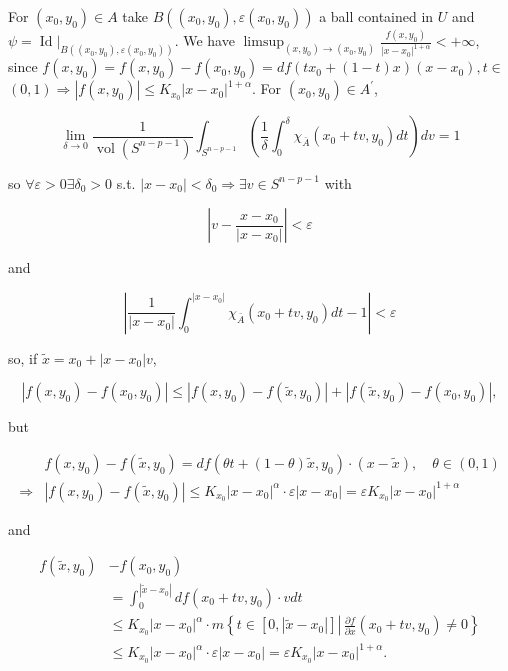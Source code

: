 \documentclass[10pt]{article}
\begin{document}
For $\left(x_{0}, y_{0}\right) \in A$ take $B\left(\left(x_{0}, y_{0}\right), \varepsilon\left(x_{0}, y_{0}\right)\right)$ a ball contained in $U$ and $\psi=\left.\operatorname{Id}\right|_{B\left(\left(x_{0}, y_{0}\right), \varepsilon\left(x_{0}, y_{0}\right)\right)}$. We have $\limsup _{\left(x, y_{0}\right) \rightarrow\left(x_{0}, y_{0}\right)} \frac{f\left(x, y_{0}\right)}{\left|x-x_{0}\right|^{1+\alpha}}<+\infty$, since $f\left(x, y_{0}\right)=f\left(x, y_{0}\right)-f\left(x_{0}, y_{0}\right)=d f\left(t x_{0}+(1-t) x\right)\left(x-x_{0}\right), t \in$ $(0,1) \Rightarrow\left|f\left(x, y_{0}\right)\right| \leq K_{x_{0}}\left|x-x_{0}\right|^{1+\alpha}$. For $\left(x_{0}, y_{0}\right) \in A^{\prime}$,

$$
\lim _{\delta \rightarrow 0} \frac{1}{\operatorname{vol}\left(S^{n-p-1}\right)} \int_{S^{n-p-1}}\left(\frac{1}{\delta} \int_{0}^{\delta} \chi_{\bar{A}}\left(x_{0}+t v, y_{0}\right) d t\right) d v=1
$$

so $\forall \varepsilon>0 \exists \delta_{0}>0$ s.t. $\left|x-x_{0}\right|<\delta_{0} \Rightarrow \exists v \in S^{n-p-1}$ with

$$
\left|v-\frac{x-x_{0}}{\left|x-x_{0}\right|}\right|<\varepsilon
$$

and

$$
\left|\frac{1}{\left|x-x_{0}\right|} \int_{0}^{\left|x-x_{0}\right|} \chi_{\bar{A}}\left(x_{0}+t v, y_{0}\right) d t-1\right|<\varepsilon
$$

so, if $\tilde{x}=x_{0}+\left|x-x_{0}\right| v$,

$$
\left|f\left(x, y_{0}\right)-f\left(x_{0}, y_{0}\right)\right| \leq\left|f\left(x, y_{0}\right)-f\left(\tilde{x}, y_{0}\right)\right|+\left|f\left(\tilde{x}, y_{0}\right)-f\left(x_{0}, y_{0}\right)\right|,
$$

but

$$
\begin{aligned}
& f\left(x, y_{0}\right)-f\left(\tilde{x}, y_{0}\right)=d f\left(\theta t+(1-\theta) \tilde{x}, y_{0}\right) \cdot(x-\tilde{x}), \quad \theta \in(0,1) \\
\Rightarrow & \left|f\left(x, y_{0}\right)-f\left(\tilde{x}, y_{0}\right)\right| \leq K_{x_{0}}\left|x-x_{0}\right|^{\alpha} \cdot \varepsilon\left|x-x_{0}\right|=\varepsilon K_{x_{0}}\left|x-x_{0}\right|^{1+\alpha}
\end{aligned}
$$

and

$$
\begin{aligned}
f\left(\tilde{x}, y_{0}\right) & -f\left(x_{0}, y_{0}\right) \\
& =\int_{0}^{\left|\tilde{x}-x_{0}\right|} d f\left(x_{0}+t v, y_{0}\right) \cdot v d t \\
& \leq K_{x_{0}}\left|x-x_{0}\right|^{\alpha} \cdot m\left\{t \in\left[0,\left|\tilde{x}-x_{0}\right|\right] \left\lvert\, \frac{\partial f}{\partial x}\left(x_{0}+t v, y_{0}\right) \neq 0\right.\right\} \\
& \leq K_{x_{0}}\left|x-x_{0}\right|^{\alpha} \cdot \varepsilon\left|x-x_{0}\right|=\varepsilon K_{x_{0}}\left|x-x_{0}\right|^{1+\alpha} .
\end{aligned}
$$
\end{document}
